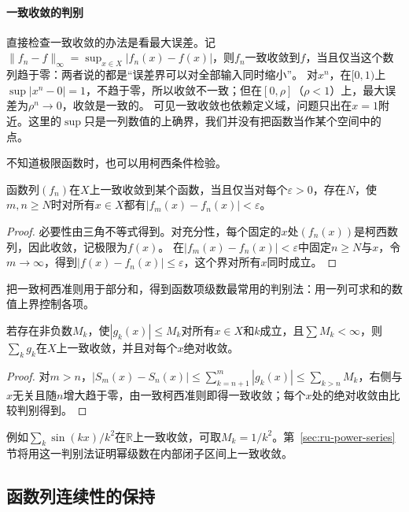 \paragraph{一致收敛的判别}
直接检查一致收敛的办法是看最大误差。记$\|f_n-f\|_\infty=\sup_{x\in X}|f_n(x)-f(x)|$，则$f_n$一致收敛到$f$，当且仅当这个数列趋于零：两者说的都是“误差界可以对全部输入同时缩小”。
对$x^n$，在$[0,1)$上$\sup|x^n-0|=1$，不趋于零，所以收敛不一致；但在$[0,\rho]$（$\rho<1$）上，最大误差为$\rho^n\to0$，收敛是一致的。
可见一致收敛也依赖定义域，问题只出在$x=1$附近。这里的$\sup$只是一列数值的上确界，我们并没有把函数当作某个空间中的点。

不知道极限函数时，也可以用柯西条件检验。
\begin{theorem}[一致柯西准则]
\label{thm:ru-uniform-cauchy}
函数列$(f_n)$在$X$上一致收敛到某个函数，当且仅当对每个$\varepsilon>0$，存在$N$，使$m,n\geq N$时对所有$x\in X$都有$|f_m(x)-f_n(x)|<\varepsilon$。
\end{theorem}
\begin{proof}
必要性由三角不等式得到。对充分性，每个固定的$x$处$(f_n(x))$是柯西数列，因此收敛，记极限为$f(x)$。
在$|f_m(x)-f_n(x)|<\varepsilon$中固定$n\geq N$与$x$，令$m\to\infty$，得到$|f(x)-f_n(x)|\leq\varepsilon$，这个界对所有$x$同时成立。
\end{proof}

把一致柯西准则用于部分和，得到函数项级数最常用的判别法：用一列可求和的数值上界控制各项。
\begin{theorem}[Weierstrass判别法]
\label{thm:ru-weierstrass-m-test}
若存在非负数$M_k$，使$|g_k(x)|\leq M_k$对所有$x\in X$和$k$成立，且$\sum M_k<\infty$，则$\sum_kg_k$在$X$上一致收敛，并且对每个$x$绝对收敛。
\end{theorem}
\begin{proof}
对$m>n$，$|S_m(x)-S_n(x)|\leq\sum_{k=n+1}^m|g_k(x)|\leq\sum_{k>n}M_k$，右侧与$x$无关且随$n$增大趋于零，由一致柯西准则即得一致收敛；每个$x$处的绝对收敛由比较判别得到。
\end{proof}
例如$\sum_k\sin(kx)/k^2$在$\mathbb R$上一致收敛，可取$M_k=1/k^2$。第~\ref{sec:ru-power-series}节将用这一判别法证明幂级数在内部闭子区间上一致收敛。

\subsection{函数列连续性的保持}
\label{sec:ru-uniform-limit-continuity}

